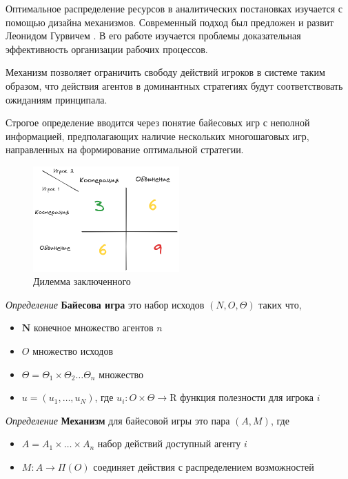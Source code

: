 Оптимальное распределение ресурсов в аналитических постановках изучается с помощью дизайна механизмов.
Современный подход был предложен и развит Леонидом Гурвичем \cite{hurwicz1960optimality}.
В его работе изучается проблемы доказательная эффективность организации рабочих процессов.

Механизм позволяет ограничить свободу действий игроков в системе таким образом, 
что действия агентов в доминантных стратегиях будут соответствовать ожиданиям принципала.

Строгое определение вводится через понятие байесовых игр с неполной информацией, 
предполагающих наличие нескольких многошаговых игр, направленных на формирование оптимальной стратегии. 


\begin{figure}[h]
    \centering
    \includegraphics[width=0.5\textwidth]{assets/pedagogic/social/dilemma.excalidraw.png}
    \caption{Дилемма заключенного}
    \label{dilemma}
\end{figure}


\textit{Определение} \textbf{Байесова игра} это набор исходов $(N,O,\Theta)$ таких что,
\begin{itemize}
    \item $\mathbf{N}$ конечное множество агентов $n$
    \item $O$ множество исходов
    \item  $\Theta = \Theta_1 \times \Theta_2 \dots \Theta_n $ множество 
    \item $u = (u_1, \dots, u_N)$, где $u_i: O \times \Theta \rightarrow \mathrm{R}$  функция полезности для игрока $i$
\end{itemize}

\textit{Определение} \textbf{Механизм} для байесовой игры это пара $(A,M)$, где \begin{itemize}
    \item $A = A_1 \times \dots \times A_n$ набор действий доступный агенту $i$
    \item $M: A \rightarrow \Pi(O)$ соединяет действия с распределением возможностей
\end{itemize}


